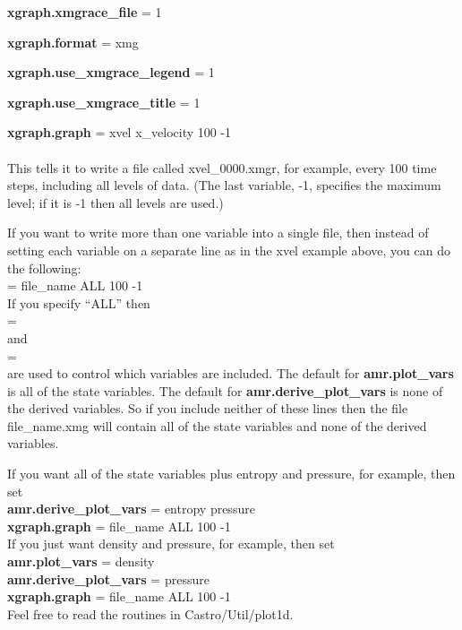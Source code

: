 {\bf xgraph.xmgrace\_file} = 1

{\bf xgraph.format} = xmg

{\bf xgraph.use\_xmgrace\_legend} = 1

{\bf xgraph.use\_xmgrace\_title} = 1

{\bf xgraph.graph} = xvel x\_velocity 100 -1\\ \\
This tells it to write a file called xvel\_0000.xmgr, for example, every 100 time steps, including all levels of data. (The last variable, -1, specifies the maximum level; if it is -1 then all levels are used.)

If you want to write more than one variable into a single file, then instead of
setting each variable on a separate line as in the xvel example above,
you can do the following: \\

 = file\_name ALL 100 -1\\

\noindent If you specify ``ALL'' then \\

 = \\

\noindent and \\

 = \\

\noindent are used to control which variables are included.  The default for {\bf amr.plot\_vars}
is all of the state variables.  The default for {\bf amr.derive\_plot\_vars} is none of
the derived variables.  So if you include neither of these lines then the file 
file\_name.xmg will contain all of the state variables and none of the derived variables.

If you want all of the state variables plus entropy and pressure, for example, then set \\

{\bf amr.derive\_plot\_vars} = entropy pressure \\

{\bf xgraph.graph} = file\_name ALL 100 -1\\

If you just want density and pressure, for example, then set \\

{\bf amr.plot\_vars} =  density \\

{\bf amr.derive\_plot\_vars} = pressure \\

{\bf xgraph.graph} = file\_name ALL 100 -1\\ 

Feel free to read the routines in Castro/Util/plot1d.

